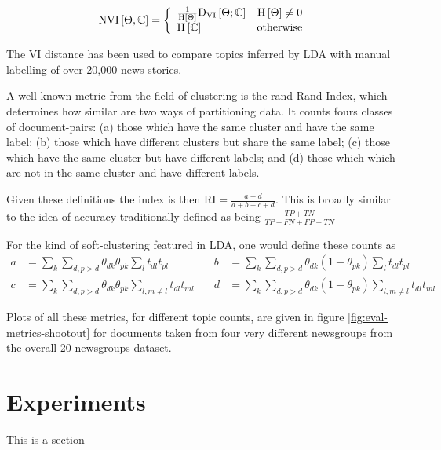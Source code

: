 \begin{align}
\text{NVI}\left[ \Theta, \mathbb{C} \right] = \left\{ \begin{array}{lr}
     \frac{1}{\text{H} \left[ \Theta \right]}\text{D}_\text{VI} \left[ \Theta; \mathbb{C} \right] & \text{H} \left[ \Theta \right] \neq 0 \\
     \text{H} \left[ \mathbb{C} \right] & \text{otherwise}
 \end{array}\right.
\end{align}


The VI distance has been used to compare topics inferred by LDA with manual labelling of over 20,000 news-stories\cite{HeinrichEtAl2005}. 


A well-known metric from the field of clustering is the rand Rand Index, which determines how similar are two ways of partitioning data. It counts fours classes of document-pairs: (a) those which have the same cluster and have the same label; (b) those which have different clusters but share the same label; (c) those which have the same cluster but have different labels; and (d) those which which are not in the same cluster and have different labels.

Given these definitions the index is then $\text{RI} = \frac{a + d}{a + b + c + d}$. This is broadly similar to the idea of accuracy traditionally defined as being $\frac{TP + TN}{TP + FN + FP + TN}$

For the kind of soft-clustering featured in LDA, one would define these counts as
\begin{equation}
\begin{aligned}
a & = \sum_k \sum_{d, {p>d}} \theta_{dk} \theta_{pk} \sum_l t_{dl}t_{pl} & \quad
b & = \sum_k \sum_{d, {p>d}} \theta_{dk} (1 -\theta_{pk}) \sum_l t_{dl}t_{pl}\\
c & = \sum_k \sum_{d, {p>d}} \theta_{dk} \theta_{pk} \sum_{l,m \neq l} t_{dl}t_{ml} & \quad
d & = \sum_k \sum_{d, {p>d}} \theta_{dk} (1- \theta_{pk}) \sum_{l,m \neq l} t_{dl}t_{ml}
\end{aligned}
\end{equation}

Plots of all these metrics, for different topic counts, are given in figure \ref{fig:eval-metrics-shootout} for documents taken from four very different newsgroups from the overall 20-newsgroups dataset.

\section{Experiments}
\label{sec:chap1:experiments}
This is a section

